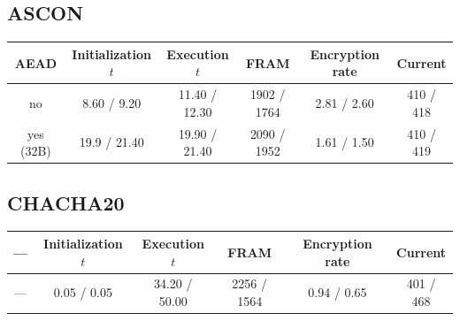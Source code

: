 \documentclass[target=bach,aauheader=,style=]{thud}
\begin{document}
		\subsection{ASCON}
		\begin{center}
			\begin{tabular}{|c| *{5}{c|}}
				\hline
				\textbf{AEAD} & \textbf{Initialization} $t$& \textbf{Execution} $t$ & \textbf{FRAM} & \textbf{Encryption rate} & \textbf{Current} \\
				\hline
				no & \textcolor{Mahogany}{8.60} / \textcolor{OliveGreen}{9.20} & \textcolor{Mahogany}{11.40} / \textcolor{OliveGreen}{12.30} & \textcolor{Mahogany}{1902} / \textcolor{OliveGreen}{1764} & \textcolor{Mahogany}{2.81} / \textcolor{OliveGreen}{2.60} & \textcolor{Mahogany}{410} / \textcolor{OliveGreen}{418} \\
				\hline
				yes (32B) & \textcolor{Mahogany}{19.9} / \textcolor{OliveGreen}{21.40} & \textcolor{Mahogany}{19.90} / \textcolor{OliveGreen}{21.40} & \textcolor{Mahogany}{2090} / \textcolor{OliveGreen}{1952} & \textcolor{Mahogany}{1.61} / \textcolor{OliveGreen}{1.50} & \textcolor{Mahogany}{410} / \textcolor{OliveGreen}{419} \\
				\hline
			\end{tabular}
		\end{center}
		
		\subsection{CHACHA20}
		\begin{center}
			\begin{tabular}{|c| *{5}{c|}}
				\hline
				\textbf{---} & \textbf{Initialization} $t$& \textbf{Execution} $t$ & \textbf{FRAM} & \textbf{Encryption rate} & \textbf{Current} \\
				\hline
				--- & \textcolor{Mahogany}{0.05} / \textcolor{OliveGreen}{0.05} & \textcolor{Mahogany}{34.20} / \textcolor{OliveGreen}{50.00} & \textcolor{Mahogany}{2256} / \textcolor{OliveGreen}{1564} & \textcolor{Mahogany}{0.94} / \textcolor{OliveGreen}{0.65} & \textcolor{Mahogany}{401} / \textcolor{OliveGreen}{468} \\
				\hline
			\end{tabular}
		\end{center}
		
\end{document}
